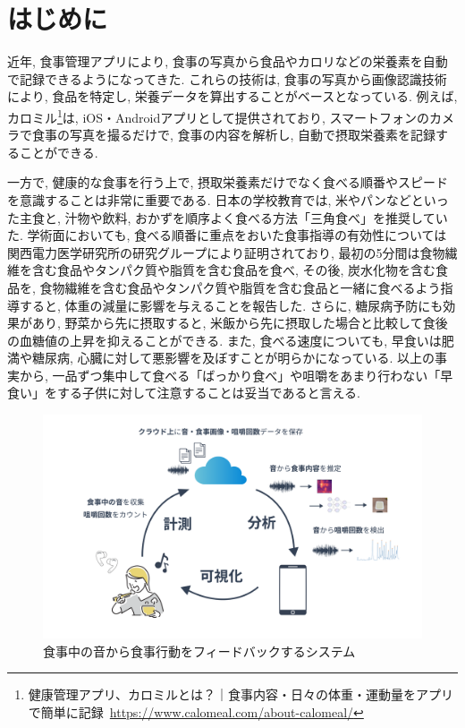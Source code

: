 
\chapter{はじめに}
\label{cha:intro}

近年, 食事管理アプリにより, 食事の写真から食品やカロリなどの栄養素を自動で記録できるようになってきた. これらの技術は, 食事の写真から画像認識技術により, 食品を特定し, 栄養データを算出することがベースとなっている. 例えば, カロミル\footnote{健康管理アプリ、カロミルとは？｜食事内容・日々の体重・運動量をアプリで簡単に記録~\url{https://www.calomeal.com/about-calomeal/}}は, iOS・Androidアプリとして提供されており, スマートフォンのカメラで食事の写真を撮るだけで, 食事の内容を解析し, 自動で摂取栄養素を記録することができる.

一方で, 健康的な食事を行う上で, 摂取栄養素だけでなく食べる順番やスピードを意識することは非常に重要である. 日本の学校教育では, 米やパンなどといった主食と, 汁物や飲料, おかずを順序よく食べる方法「三角食べ」を推奨していた. 学術面においても, 食べる順番に重点をおいた食事指導の有効性については関西電力医学研究所の研究グループにより証明されており, 最初の5分間は食物繊維を含む食品やタンパク質や脂質を含む食品を食べ, その後, 炭水化物を含む食品を, 食物繊維を含む食品やタンパク質や脂質を含む食品と一緒に食べるよう指導すると, 体重の減量に影響を与えることを報告した\cite{yabe2019107450}. さらに, 糖尿病予防にも効果があり, 野菜から先に摂取すると, 米飯から先に摂取した場合と比較して食後の血糖値の上昇を抑えることができる\cite{tonyobyo53112}. また, 食べる速度についても, 早食いは肥満や糖尿病, 心臓に対して悪影響を及ぼすことが明らかになっている\cite{20249}\cite{beyond_willpower}. 以上の事実から, 一品ずつ集中して食べる「ばっかり食べ」や咀嚼をあまり行わない「早食い」をする子供に対して注意することは妥当であると言える.

\begin{figure}[t]
  \begin{center}
    \includegraphics[clip,  width=1.0\hsize]{img/system.png}
    \caption{食事中の音から食事行動をフィードバックするシステム}
    \label{fig:system}
  \end{center}
\end{figure}

